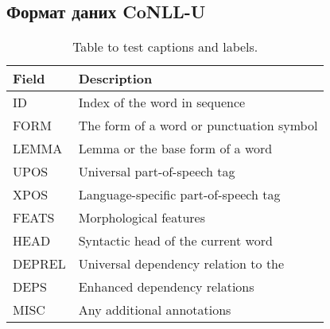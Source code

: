 \subsection{Формат даних CoNLL-U}

\begin{table}[ht]
\begin{tabular}{|l|l|}
\hline
  Field   & Description \\ \hline
ID        & Index of the word in sequence \\ \hline
FORM      & The form of a word or punctuation symbol \\ \hline
LEMMA     & Lemma or the base form of a word \\ \hline
UPOS      & Universal part-of-speech tag \\ \hline
XPOS      & Language-specific part-of-speech tag \\ \hline
FEATS     & Morphological features \\ \hline
HEAD      & Syntactic head of the current word \\ \hline
DEPREL    & Universal dependency relation to the \\ \hline
DEPS      & Enhanced dependency relations \\ \hline
MISC      & Any additional annotations \\ \hline
\end{tabular}
\caption{Table to test captions and labels.}
\label{table:1}
\end{table}